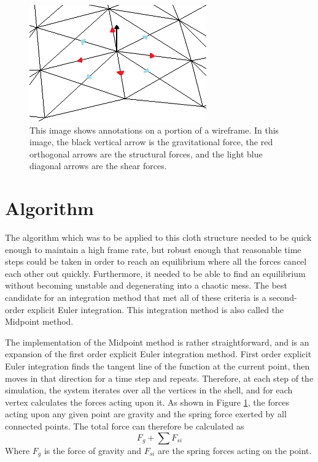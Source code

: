 \documentclass{thesis}
\begin{document}
\begin{figure}
\centering
\includegraphics[width=3in]{images/wireframe_detail.png}
\caption[Detail of a wireframe of a simulated model]{This image shows annotations on a portion of a wireframe.  In this image, the black
vertical arrow is the gravitational force, the red orthogonal arrows are the structural forces, and the light blue diagonal arrows are the
shear forces.}
\label{fig:wireframe_detail}
\end{figure}

\section{Algorithm}
The algorithm which was to be applied to this cloth structure needed to be quick enough to maintain a high frame rate, but robust enough
that reasonable time steps could be taken in order to reach an equilibrium where all the forces cancel each other out quickly.
Furthermore, it needed to be able to find an equilibrium without becoming unstable and degenerating into a chaotic mess.  The
best candidate for an integration method that met all of these criteria is a second-order explicit Euler integration.  This
integration method is also called the Midpoint method.

The implementation of the Midpoint method is rather straightforward, and is an expansion of the first order explicit Euler integration
method.  First order explicit Euler integration finds the tangent line of the function at the current point, then moves in that direction
for a time step and repeats.  Therefore, at each step of the simulation, the system iterates over all the vertices in the shell, and for
each vertex calculates the forces acting upon it.  As shown in Figure \ref{fig:wireframe_detail}, the forces acting upon any given point are
gravity and the spring force exerted by all connected points.  The total force can therefore be calculated as \[F_g+\sum{F_{si}}\]
Where $F_g$ is the force of gravity and $F_{si}$ are the spring forces acting on the point.
\end{document}
